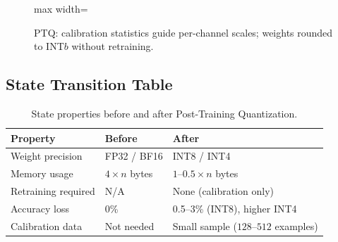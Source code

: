 \begin{figure}[h]
\centering
\begin{adjustbox}{max width=\linewidth}
\end{adjustbox}
\caption{PTQ: calibration statistics guide per-channel scales; weights rounded to INT$b$ without retraining.}
\end{figure}

\subsection{State Transition Table}
\begin{table}[h]\centering
\begin{tabular}{lll}\toprule
\textbf{Property} & \textbf{Before} & \textbf{After}\\\midrule
Weight precision & FP32 / BF16 & INT8 / INT4\\
Memory usage & $4 \times n$ bytes & $1$--$0.5 \times n$ bytes\\
Retraining required & N/A & None (calibration only)\\
Accuracy loss & 0\% & 0.5--3\% (INT8), higher INT4\\
Calibration data & Not needed & Small sample ($128$--$512$ examples)\\\bottomrule
\end{tabular}
\caption{State properties before and after Post-Training Quantization.}
\end{table}

